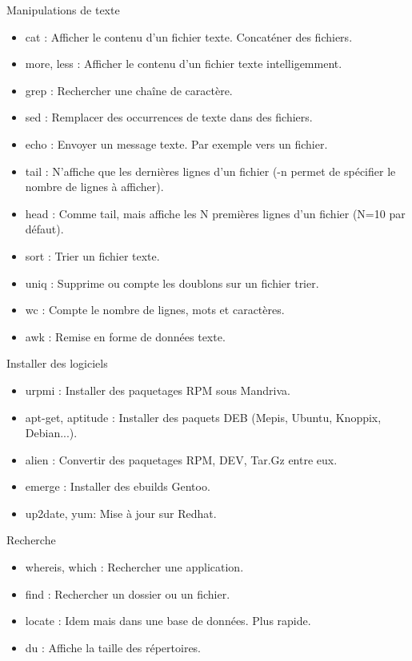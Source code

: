 \documentclass[10pt]{beamer}
\begin{document}
\begin{frame}{Manipulations de texte}
\begin{itemize}
\item \alert{cat} : Afficher le contenu d'un fichier texte. Concaténer des fichiers.
\item \alert{more}, less : Afficher le contenu d'un fichier texte intelligemment.
\item \alert{grep} : Rechercher une chaîne de caractère.
\item \alert{sed} : Remplacer des occurrences de texte dans des fichiers.
\item \alert{echo} : Envoyer un message texte. Par exemple vers un fichier.
\item \alert{tail} : N’affiche que les dernières lignes d’un fichier (-n permet de spécifier le nombre de lignes à afficher).
\item \alert{head} : Comme tail, mais affiche les N premières lignes d’un fichier (N=10 par défaut).
\item \alert{sort} : Trier un fichier texte.
\item \alert{uniq} : Supprime ou compte les doublons sur un fichier trier.
\item \alert{wc} : Compte le nombre de lignes, mots et caractères.
\item \alert{awk} : Remise en forme de données texte.
\end{itemize}
\end{frame}

\begin{frame}{Installer des logiciels}
\begin{itemize}
\item \alert{urpmi} : Installer des paquetages RPM sous Mandriva.
\item \alert{apt-get}, \alert{aptitude} : Installer des paquets DEB (Mepis, Ubuntu, Knoppix, Debian...).
\item \alert{alien} : Convertir des paquetages RPM, DEV, Tar.Gz entre eux.
\item \alert{emerge} : Installer des ebuilds Gentoo.
\item \alert{up2date}, yum: Mise à jour sur Redhat.
\end{itemize}
\end{frame}

\begin{frame}{Recherche}
\begin{itemize}
\item \alert{whereis}, \alert{which} : Rechercher une application.
\item \alert{find} : Rechercher un dossier ou un fichier.
\item \alert{locate} : Idem mais dans une base de données. Plus rapide.
\item \alert{du} : Affiche la taille des répertoires.
\end{itemize}
\end{frame}
\end{document}
